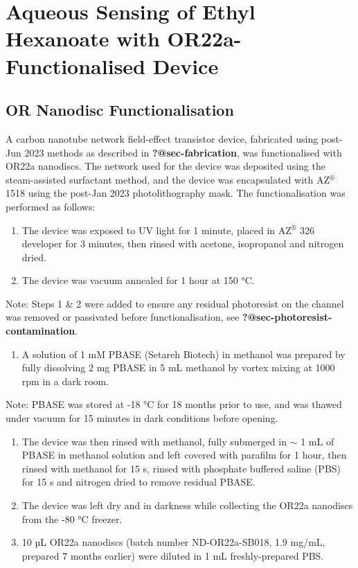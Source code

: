 \documentclass[
  a4paper,
]{scrbook}
\providecommand{\tightlist}{%
  \setlength{\itemsep}{0pt}\setlength{\parskip}{0pt}}\usepackage{longtable,booktabs,array}
\begin{document}
\hypertarget{sec-aqueous-sensing-EtHex}{%
\section{Aqueous Sensing of Ethyl Hexanoate with OR22a-Functionalised
Device}\label{sec-aqueous-sensing-EtHex}}

\hypertarget{sec-working-PBASE-functionalisation}{%
\subsection{OR Nanodisc
Functionalisation}\label{sec-working-PBASE-functionalisation}}

A carbon nanotube network field-effect transistor device, fabricated
using post-Jun 2023 methods as described in \textbf{?@sec-fabrication},
was functionalised with OR22a nanodiscs. The network used for the device
was deposited using the steam-assisted surfactant method, and the device
was encapsulated with AZ\(^\circledR\) 1518 using the post-Jan 2023
photolithography mask. The functionalisation was performed as follows:

\begin{enumerate}
\def\labelenumi{\arabic{enumi}.}
\item
  The device was exposed to UV light for 1 minute, placed in
  AZ\(^\circledR\) 326 developer for 3 minutes, then rinsed with
  acetone, isopropanol and nitrogen dried.
\item
  The device was vacuum annealed for 1 hour at 150 °C.
\end{enumerate}

Note: Steps 1 \& 2 were added to ensure any residual photoresist on the
channel was removed or passivated before functionalisation, see
\textbf{?@sec-photoresist-contamination}.

\begin{enumerate}
\def\labelenumi{\arabic{enumi}.}
\setcounter{enumi}{2}
\tightlist
\item
  A solution of 1 mM PBASE (Setareh Biotech) in methanol was prepared by
  fully dissolving 2 mg PBASE in 5 mL methanol by vortex mixing at 1000
  rpm in a dark room.
\end{enumerate}

Note: PBASE was stored at -18 °C for 18 months prior to use, and was
thawed under vacuum for 15 minutes in dark conditions before opening.

\begin{enumerate}
\def\labelenumi{\arabic{enumi}.}
\setcounter{enumi}{3}
\item
  The device was then rinsed with methanol, fully submerged in \(\sim\)
  1 mL of PBASE in methanol solution and left covered with parafilm for
  1 hour, then rinsed with methanol for 15 s, rinsed with phosphate
  buffered saline (PBS) for 15 s and nitrogen dried to remove residual
  PBASE.
\item
  The device was left dry and in darkness while collecting the OR22a
  nanodiscs from the -80 °C freezer.
\item
  10 µL OR22a nanodiscs (batch number ND-OR22a-SB018, 1.9 mg/mL,
  prepared 7 months earlier) were diluted in 1 mL freshly-prepared PBS.
\end{enumerate}
\end{document}
